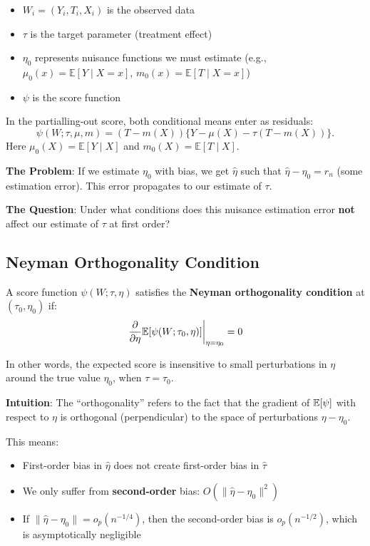 \begin{itemize}
\item
  \(W_i = (Y_i, T_i, X_i)\) is the observed data
\item
  \(\tau\) is the target parameter (treatment effect)
\item
  \(\eta_0\) represents nuisance functions we must estimate (e.g.,
  \(\mu_0(x) = \mathbb{E}[Y \mid X=x]\),
  \(m_0(x) = \mathbb{E}[T \mid X=x]\))
\item
  \(\psi\) is the score function
\end{itemize}

In the partialling-out score, both conditional means enter as residuals:
\[
\psi(W;\tau,\mu,m)=(T-m(X))\{Y-\mu(X)-\tau(T-m(X))\}.
\]
Here \(\mu_0(X)=\mathbb E[Y\mid X]\) and \(m_0(X)=\mathbb E[T\mid X]\).

\textbf{The Problem}: If we estimate \(\eta_0\) with bias, we get
\(\hat{\eta}\) such that \(\hat{\eta} - \eta_0 = r_n\) (some estimation
error). This error propagates to our estimate of \(\tau\).

\textbf{The Question}: Under what conditions does this nuisance
estimation error \textbf{not} affect our estimate of \(\tau\) at first
order?

\subsection{Neyman Orthogonality
Condition}\label{_neyman_orthogonality_condition}

\begin{definition}
\label{def:neyman_orthogonality}
%
A score function $\psi(W; \tau, \eta)$ satisfies the \textbf{Neyman orthogonality condition} at $(\tau_0, \eta_0)$ if:
\[
\left. \frac{\partial}{\partial \eta} \mathbb{E}[\psi(W; \tau_0, \eta)] \right|_{\eta = \eta_0} = 0
\]

In other words, the expected score is insensitive to small perturbations in $\eta$ around the true value $\eta_0$, when $\tau = \tau_0$.

\textbf{Intuition}: The ``orthogonality'' refers to the fact that the gradient of $\mathbb{E}[\psi]$ with respect to $\eta$ is orthogonal (perpendicular) to the space of perturbations $\eta - \eta_0$.

This means:
\begin{itemize}
\item First-order bias in $\hat{\eta}$ does not create first-order bias in $\hat{\tau}$
\item We only suffer from \textbf{second-order} bias: $O(\|\hat{\eta} - \eta_0\|^2)$
\item If $\|\hat{\eta} - \eta_0\| = o_p(n^{-1/4})$, then the second-order bias is $o_p(n^{-1/2})$, which is asymptotically negligible
\end{itemize}
\end{definition}

